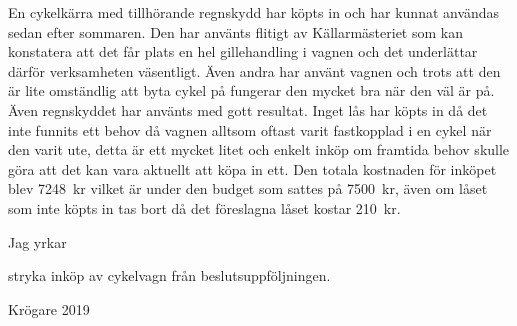 \documentclass[../_main/handlingar.tex]{subfiles}
\begin{document}

    En cykelkärra med tillhörande regnskydd har köpts in och har kunnat användas sedan efter sommaren. Den har använts flitigt av Källarmästeriet som kan konstatera att det får plats en hel gillehandling i vagnen och det underlättar därför verksamheten väsentligt. Även andra har använt vagnen och trots att den är lite omständlig att byta cykel på fungerar den mycket bra när den väl är på. Även regnskyddet har använts med gott resultat. Inget lås har köpts in då det inte funnits ett behov då vagnen alltsom oftast varit fastkopplad i en cykel när den varit ute, detta är ett mycket litet och enkelt inköp om framtida behov skulle göra att det kan vara aktuellt att köpa in ett. Den totala kostnaden för inköpet blev \SI{7248}{kr} vilket är under den budget som sattes på \SI{7500}{kr}, även om låset som inte köpts in tas bort då det föreslagna låset kostar \SI{210}{kr}. 

    Jag yrkar 

\begin{attsatser}
    \att stryka inköp av cykelvagn från beslutsuppföljningen.
\end{attsatser}

\begin{signatures}{1}
    \signature{Davida Åström}{Krögare 2019}
\end{signatures}
\end{document}
